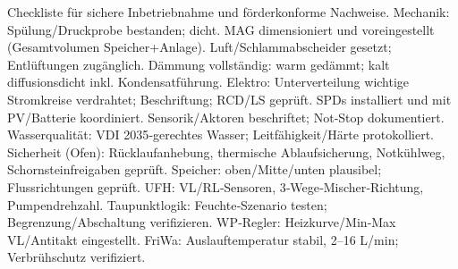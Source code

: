 \markdownRendererDocumentBegin
\markdownRendererSectionBegin
{}\markdownRendererInterblockSeparator
{}Checkliste für sichere Inbetriebnahme und förderkonforme Nachweise.\markdownRendererInterblockSeparator
{}\markdownRendererSectionBegin
{}\markdownRendererInterblockSeparator
{}\markdownRendererUlBeginTight
\markdownRendererUlItem Mechanik:\markdownRendererUlItemEnd 
\markdownRendererUlItem Spülung/Druckprobe bestanden; dicht.\markdownRendererUlItemEnd 
\markdownRendererUlItem MAG dimensioniert und voreingestellt (Gesamtvolumen Speicher+Anlage).\markdownRendererUlItemEnd 
\markdownRendererUlItem Luft/Schlammabscheider gesetzt; Entlüftungen zugänglich.\markdownRendererUlItemEnd 
\markdownRendererUlItem Dämmung vollständig: warm gedämmt; kalt diffusionsdicht inkl. Kondensatführung.\markdownRendererUlItemEnd 
\markdownRendererUlItem Elektro:\markdownRendererUlItemEnd 
\markdownRendererUlItem Unterverteilung wichtige Stromkreise verdrahtet; Beschriftung; RCD/LS geprüft.\markdownRendererUlItemEnd 
\markdownRendererUlItem SPDs installiert und mit PV/Batterie koordiniert.\markdownRendererUlItemEnd 
\markdownRendererUlItem Sensorik/Aktoren beschriftet; Not‑Stop dokumentiert.\markdownRendererUlItemEnd 
\markdownRendererUlItem Wasserqualität:\markdownRendererUlItemEnd 
\markdownRendererUlItem VDI 2035‑gerechtes Wasser; Leitfähigkeit/Härte protokolliert.\markdownRendererUlItemEnd 
\markdownRendererUlItem Sicherheit (Ofen):\markdownRendererUlItemEnd 
\markdownRendererUlItem Rücklaufanhebung, thermische Ablaufsicherung, Notkühlweg, Schornsteinfreigaben geprüft.\markdownRendererUlItemEnd 
\markdownRendererUlEndTight \markdownRendererInterblockSeparator
{}
\markdownRendererSectionEnd \markdownRendererSectionBegin
{}\markdownRendererInterblockSeparator
{}\markdownRendererUlBeginTight
\markdownRendererUlItem Speicher: oben/Mitte/unten plausibel; Flussrichtungen geprüft.\markdownRendererUlItemEnd 
\markdownRendererUlItem UFH: VL/RL‑Sensoren, 3‑Wege‑Mischer‑Richtung, Pumpendrehzahl.\markdownRendererUlItemEnd 
\markdownRendererUlItem Taupunktlogik: Feuchte‑Szenario testen; Begrenzung/Abschaltung verifizieren.\markdownRendererUlItemEnd 
\markdownRendererUlItem WP‑Regler: Heizkurve/Min‑Max VL/Antitakt eingestellt.\markdownRendererUlItemEnd 
\markdownRendererUlItem FriWa: Auslauftemperatur stabil, 2–16 L/min; Verbrühschutz verifiziert.\markdownRendererUlItemEnd 
\markdownRendererUlEndTight \markdownRendererInterblockSeparator
{}
\markdownRendererSectionEnd \markdownRendererSectionBegin
